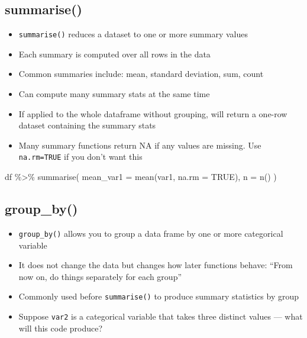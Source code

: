 \documentclass[
  letterpaper,
  DIV=11,
  numbers=noendperiod]{scrartcl}
\newenvironment{Shaded}{\begin{snugshade}}{\end{snugshade}}
\newcommand{\AttributeTok}[1]{\textcolor[rgb]{0.40,0.45,0.13}{#1}}
\newcommand{\ConstantTok}[1]{\textcolor[rgb]{0.56,0.35,0.01}{#1}}
\newcommand{\FunctionTok}[1]{\textcolor[rgb]{0.28,0.35,0.67}{#1}}
\newcommand{\NormalTok}[1]{\textcolor[rgb]{0.00,0.23,0.31}{#1}}
\newcommand{\SpecialCharTok}[1]{\textcolor[rgb]{0.37,0.37,0.37}{#1}}
\providecommand{\tightlist}{%
  \setlength{\itemsep}{0pt}\setlength{\parskip}{0pt}}
\begin{document}
\subsection{summarise()}\label{summarise}

\begin{itemize}
\tightlist
\item
  \texttt{summarise()} reduces a dataset to one or more summary values
\item
  Each summary is computed over all rows in the data
\item
  Common summaries include: mean, standard deviation, sum, count
\item
  Can compute many summary stats at the same time
\item
  If applied to the whole dataframe without grouping, will return a
  one-row dataset containing the summary stats
\item
  Many summary functions return NA if any values are missing. Use
  \texttt{na.rm=TRUE} if you don't want this
\end{itemize}

\begin{Shaded}
\begin{Highlighting}[]
\NormalTok{df }\SpecialCharTok{\%\textgreater{}\%}
  \FunctionTok{summarise}\NormalTok{(}
    \AttributeTok{mean\_var1 =} \FunctionTok{mean}\NormalTok{(var1, }\AttributeTok{na.rm =} \ConstantTok{TRUE}\NormalTok{),}
    \AttributeTok{n =} \FunctionTok{n}\NormalTok{()}
\NormalTok{  )}
\end{Highlighting}
\end{Shaded}

\subsection{group\_by()}\label{group_by}

\begin{itemize}
\tightlist
\item
  \texttt{group\_by()} allows you to group a data frame by one or more
  categorical variable
\item
  It does not change the data but changes how later functions behave:
  ``From now on, do things separately for each group''
\item
  Commonly used before \texttt{summarise()} to produce summary
  statistics by group
\item
  Suppose \texttt{var2} is a categorical variable that takes three
  distinct values --- what will this code produce?
\end{itemize}
\end{document}
